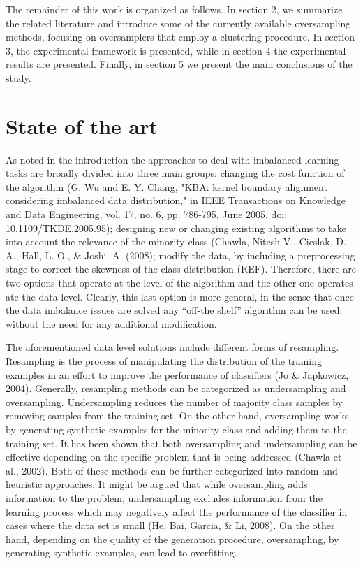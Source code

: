 \documentclass[parskip=full]{scrartcl}
\begin{document}
The remainder of this work is organized as follows. In section 2, we summarize the related literature and introduce some of the currently available oversampling methods, focusing on oversamplers that employ a clustering procedure. In section 3, the experimental framework is presented, while in section 4 the experimental results are presented. Finally, in section 5 we present the main conclusions of the study.

\section{State of the art}

As noted in the introduction the approaches to deal with imbalanced learning tasks are broadly divided into three main groups: changing the cost function of the algorithm (G. Wu and E. Y. Chang, "KBA: kernel boundary alignment considering imbalanced data distribution," in IEEE Transactions on Knowledge and Data Engineering, vol. 17, no. 6, pp. 786-795, June 2005. doi: 10.1109/TKDE.2005.95); designing new or changing existing algorithms to take into account the relevance of the minority class (Chawla, Nitesh V., Cieslak, D. A., Hall, L. O., & Joshi, A. (2008); modify the data, by including a preprocessing stage to correct the skewness of the class distribution (REF). Therefore, there are two options that operate at the level of the algorithm and the other one operates ate the data level. Clearly, this last option is more general, in the sense that once the data imbalance issues are solved any “off-the shelf” algorithm can be used, without the need for any additional modification. 

The aforementioned data level solutions include different forms of resampling. Resampling is the process of manipulating the distribution of the training examples in an effort to improve the performance of classifiers (Jo & Japkowicz, 2004). Generally, resampling methods can be categorized as undersampling and oversampling. Undersampling reduces the number of majority class samples by removing samples from the training set. On the other hand, oversampling works by generating synthetic examples for the minority class and adding them to the training set. It has been shown that both oversampling and undersampling can be effective depending on the specific problem that is being addressed (Chawla et al., 2002). Both of these methods can be further categorized into random and heuristic approaches. It might be argued that while oversampling adds information to the problem, undersampling excludes information from the learning process which may negatively affect the performance of the classifier in cases where the data set is small (He, Bai, Garcia, & Li, 2008). On the other hand, depending on the quality of the generation procedure, oversampling, by generating synthetic examples, can lead to overfitting.
\end{document}

